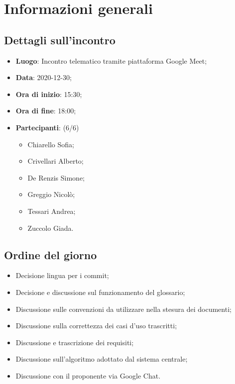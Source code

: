 \section{Informazioni generali}

\subsection{Dettagli sull'incontro}
\begin{itemize}
\item \textbf{Luogo}: Incontro telematico tramite piattaforma Google Meet;
\item \textbf{Data}: 2020-12-30;
\item \textbf{Ora di inizio}: 15:30;
\item \textbf{Ora di fine}: 18:00;
\item \textbf{Partecipanti}: (6/6)
\begin{itemize}
	\item Chiarello Sofia;
    \item Crivellari Alberto;
    \item De Renzis Simone;
    \item Greggio Nicolò;
    \item Tessari Andrea;
    \item Zuccolo Giada.
\end{itemize}
\end{itemize}

\subsection{Ordine del giorno}
\begin{itemize}
	\item Decisione lingua per i commit;
	\item Decisione e discussione sul funzionamento del glossario;
	\item Discussione sulle convenzioni da utilizzare nella stesura dei documenti;
	\item Discussione sulla correttezza dei casi d'uso trascritti;
	\item Discussione e trascrizione dei requisiti;
	\item Discussione sull'algoritmo adottato dal sistema centrale;
	\item Discussione con il proponente via Google Chat.

\end{itemize}


